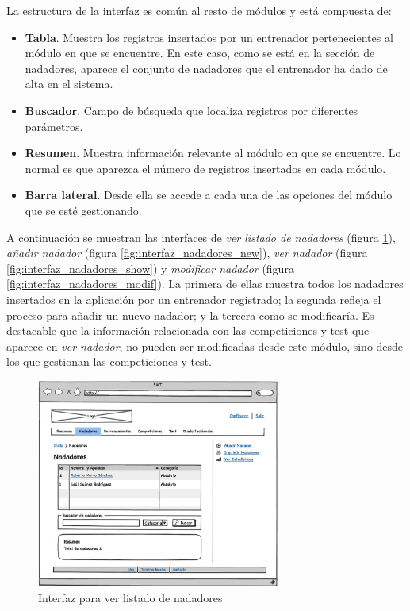 	La estructura de la interfaz es común al resto de módulos y está compuesta de:
		
	\begin{itemize}
		\item {{\bf Tabla}. Muestra los registros insertados por un entrenador pertenecientes al módulo en que se encuentre. En este caso, como se está en la sección de nadadores, aparece el conjunto de nadadores que el entrenador ha dado de alta en el sistema.}
		\item {{\bf Buscador}. Campo de búsqueda que localiza registros por diferentes parámetros.}
		\item {{\bf Resumen}. Muestra información relevante al módulo en que se encuentre. Lo normal es que aparezca el número de registros insertados en cada módulo.}
		\item {{\bf Barra lateral}. Desde ella se accede a cada una de las opciones del módulo que se esté gestionando.}
	\end{itemize}
	
	A continuación se muestran las interfaces de {\it ver listado de nadadores} (figura \ref{fig:interfaz_nadadores}), {\it añadir nadador} (figura \ref{fig:interfaz_nadadores_new}), {\it ver nadador} (figura \ref{fig:interfaz_nadadores_show}) y {\it modificar nadador} (figura \ref{fig:interfaz_nadadores_modif}). La primera de ellas muestra todos los nadadores insertados en la aplicación por un entrenador registrado; la segunda refleja el proceso para añadir un nuevo nadador; y la tercera como se modificaría. Es destacable que la información relacionada con las competiciones y test que aparece en {\it ver nadador}, no pueden ser modificadas desde este módulo, sino desde los que gestionan las competiciones y test.
	
	\begin{figure}[H]
	  \centering
	    \includegraphics[width=8cm]{./eps/p_interfaz/10_Nadadores.eps}
	  \caption{Interfaz para ver listado de nadadores}
	  \label{fig:interfaz_nadadores}
	\end{figure}
	
